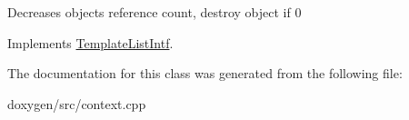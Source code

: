 Decreases object\textquotesingle{}s reference count, destroy object if 0 

Implements \mbox{\hyperlink{class_template_list_intf_a0c53169c740c09dac47efc62bbe39674}{Template\+List\+Intf}}.



The documentation for this class was generated from the following file\+:\begin{DoxyCompactItemize}
\item 
doxygen/src/context.\+cpp\end{DoxyCompactItemize}
